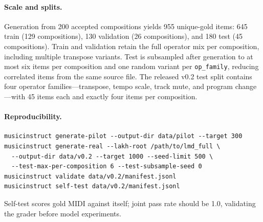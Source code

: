 \paragraph{Scale and splits.}
Generation from 200 accepted compositions yields 955 unique-gold items: 645 train (129 compositions), 130 validation (26 compositions), and 180 test (45 compositions). Train and validation retain the full operator mix per composition, including multiple transpose variants. Test is subsampled after generation to at most six items per composition and one random variant per \texttt{op\_family}, reducing correlated items from the same source file. The released v0.2 test split contains four operator families---transpose, tempo scale, track mute, and program change---with 45 items each and exactly four items per composition.

\paragraph{Reproducibility.}
\begin{verbatim}
musicinstruct generate-pilot --output-dir data/pilot --target 300
musicinstruct generate-real --lakh-root /path/to/lmd_full \
  --output-dir data/v0.2 --target 1000 --seed-limit 500 \
  --test-max-per-composition 6 --test-subsample-seed 0
musicinstruct validate data/v0.2/manifest.jsonl
musicinstruct self-test data/v0.2/manifest.jsonl
\end{verbatim}

Self-test scores gold MIDI against itself; joint pass rate should be 1.0, validating the grader before model experiments.
